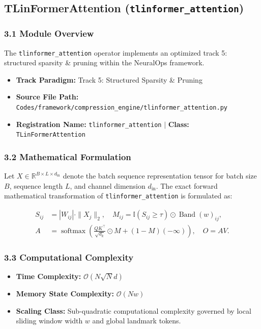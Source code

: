 \subsection{TLinFormerAttention (\texttt{tlinformer\_attention})}
\label{sec:app_module_tlinformer\_attention}

\subsubsection*{3.1 Module Overview}
The \texttt{tlinformer\_attention} operator implements an optimized track 5: structured sparsity \& pruning within the NeuralOps framework.
\begin{itemize}
    \item \textbf{Track Paradigm:} Track 5: Structured Sparsity & Pruning
    \item \textbf{Source File Path:} \texttt{Codes/framework/compression\_engine/tlinformer\_attention.py}
    \item \textbf{Registration Name:} \texttt{tlinformer\_attention} $\mid$ \textbf{Class:} \texttt{TLinFormerAttention}
\end{itemize}

\subsubsection*{3.2 Mathematical Formulation}
Let $X \in \mathbb{R}^{B \times L \times d_{\text{in}}}$ denote the batch sequence representation tensor for batch size $B$, sequence length $L$, and channel dimension $d_{\text{in}}$. The exact forward mathematical transformation of \texttt{tlinformer\_attention} is formulated as:

\begin{align}
S_{ij} &= |W_{ij}| \cdot \|X_j\|_2, \quad M_{ij} = \mathbb{I}(S_{ij} \ge \tau) \odot \operatorname{Band}(w)_{ij}, \\
A &= \operatorname{softmax}\left(\frac{Q K^\top}{\sqrt{d_k}} \odot M + (1 - M)(-\infty)\right), \quad O = A V.
\end{align}


\subsubsection*{3.3 Computational Complexity}
\begin{itemize}
    \item \textbf{Time Complexity:} $\mathcal{O}(N \sqrt{N} d)$
    \item \textbf{Memory State Complexity:} $\mathcal{O}(N w)$
    \item \textbf{Scaling Class:} Sub-quadratic computational complexity governed by local sliding window width $w$ and global landmark tokens.
\end{itemize}

